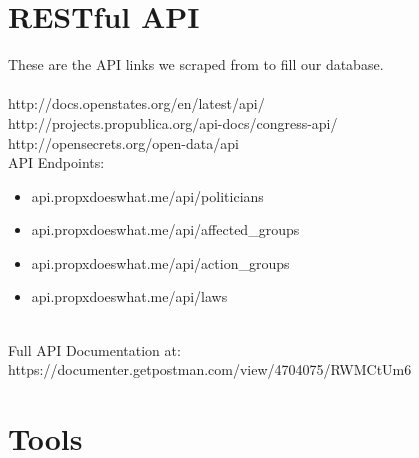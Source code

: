 \documentclass[12pt]{article}
\begin{document}
\section{RESTful API}
These are the API links we scraped from to fill our database.\\ \\http://docs.openstates.org/en/latest/api/ \\http://projects.propublica.org/api-docs/congress-api/ \\http://opensecrets.org/open-data/api\\

API Endpoints: \\

\begin{itemize}
	\item api.propxdoeswhat.me/api/politicians
	\item api.propxdoeswhat.me/api/affected\_groups
	\item api.propxdoeswhat.me/api/action\_groups
	\item api.propxdoeswhat.me/api/laws
\end{itemize}

~\\
Full API Documentation at: https://documenter.getpostman.com/view/4704075/RWMCtUm6

\section{Tools}
\end{document}

